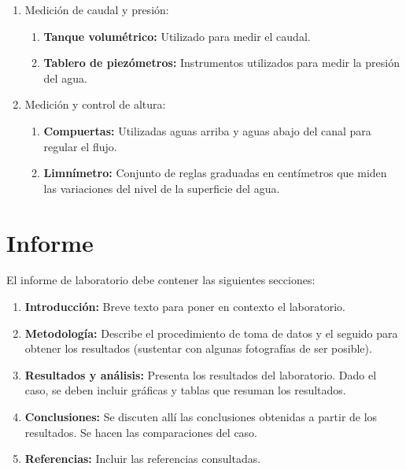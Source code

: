 \documentclass[10pt, a4paper]{exam}
\begin{document}
\begin{enumerate}

    \item Medición de caudal y presión:
    
        \begin{enumerate}
        
            \item \textbf{Tanque volumétrico:} Utilizado para medir el caudal.

            \item \textbf{Tablero de piezómetros:} Instrumentos utilizados para medir la presión del agua.
            
        \end{enumerate}
        
    \item Medición y control de altura:
    
        \begin{enumerate}
        
            \item \textbf{Compuertas:} Utilizadas aguas arriba y aguas abajo del canal para regular el flujo.
            \item \textbf{Limnímetro:} Conjunto de reglas graduadas en centímetros que miden las variaciones del nivel de la superficie del agua.
            
        \end{enumerate}
        
\end{enumerate}

\section{Informe}

El informe de laboratorio debe contener las siguientes secciones:

\begin{enumerate}

    \item \textbf{Introducción:} Breve texto para poner en contexto el laboratorio.
    
    \item \textbf{Metodología:} Describe el procedimiento de toma de datos y el seguido para obtener los resultados (sustentar con algunas fotografías de ser posible).
    
    \item \textbf{Resultados y análisis:} Presenta los resultados del laboratorio. Dado el caso, se deben incluir gráficas y tablas que resuman los resultados.
    
    \item \textbf{Conclusiones:} Se discuten allí las conclusiones obtenidas a partir de los resultados. Se hacen las comparaciones del caso.
    
    \item \textbf{Referencias:} Incluir las referencias consultadas.
\end{enumerate}
\end{document}
